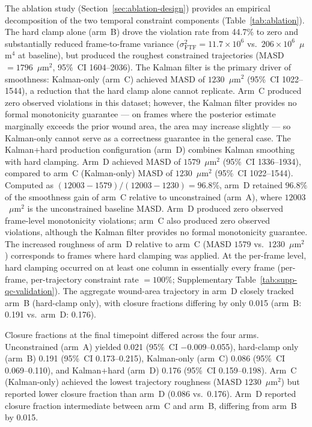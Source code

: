 The ablation study (Section~\ref{sec:ablation-design}) provides an empirical decomposition of the two temporal constraint components (Table~\ref{tab:ablation}).
The hard clamp alone (arm~B) drove the violation rate from 44.7\% to zero and substantially reduced frame-to-frame variance ($\sigma^2_\text{FTF} = 11.7 \times 10^6$ vs.\ $206 \times 10^6$~$\mu$m$^4$ at baseline), but produced the roughest constrained trajectories (MASD $= 1796$~$\mu$m$^2$, 95\%~CI 1604--2036).
The Kalman filter is the primary driver of smoothness: Kalman-only (arm~C) achieved MASD of $1230$~$\mu$m$^2$ (95\%~CI 1022--1544), a reduction that the hard clamp alone cannot replicate.
Arm~C produced zero observed violations in this dataset; however, the Kalman filter provides no formal monotonicity guarantee --- on frames where the posterior estimate marginally exceeds the prior wound area, the area may increase slightly --- so Kalman-only cannot serve as a correctness guarantee in the general case.
The Kalman+hard production configuration (arm~D) combines Kalman smoothing with hard clamping.
Arm~D achieved MASD of $1579$~$\mu$m$^2$ (95\%~CI 1336--1934), compared to arm~C (Kalman-only) MASD of $1230$~$\mu$m$^2$ (95\%~CI 1022--1544). Computed as $(12003 - 1579)/(12003 - 1230) = 96.8\%$, arm~D retained $96.8\%$ of the smoothness gain of arm~C relative to unconstrained (arm~A), where $12003$~$\mu$m$^2$ is the unconstrained baseline MASD. Arm~D produced zero observed frame-level monotonicity violations; arm~C also produced zero observed violations, although the Kalman filter provides no formal monotonicity guarantee.
The increased roughness of arm~D relative to arm~C (MASD $1579$ vs.\ $1230$~$\mu$m$^2$) corresponds to frames where hard clamping was applied. At the per-frame level, hard clamping occurred on at least one column in essentially every frame (per-frame, per-trajectory constraint rate $= 100\%$; Supplementary Table~\ref{tab:supp-qc-validation}). The aggregate wound-area trajectory in arm~D closely tracked arm~B (hard-clamp only), with closure fractions differing by only 0.015 (arm~B: 0.191 vs.\ arm~D: 0.176).

Closure fractions at the final timepoint differed across the four arms. Unconstrained (arm~A) yielded 0.021 (95\%~CI $-0.009$--0.055), hard-clamp only (arm~B) 0.191 (95\%~CI 0.173--0.215), Kalman-only (arm~C) 0.086 (95\%~CI 0.069--0.110), and Kalman+hard (arm~D) 0.176 (95\%~CI 0.159--0.198). Arm~C (Kalman-only) achieved the lowest trajectory roughness (MASD $1230$~$\mu$m$^2$) but reported lower closure fraction than arm~D (0.086 vs.\ 0.176). Arm~D reported closure fraction intermediate between arm~C and arm~B, differing from arm~B by 0.015.

